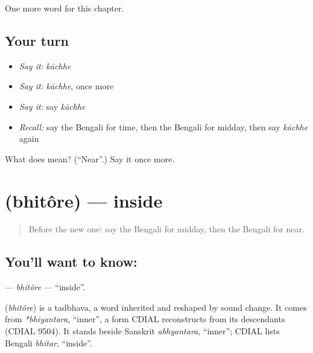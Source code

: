\begin{grammarlens}[title={What you've built}]
One more word for this chapter.
\end{grammarlens}

\subsection*{Your turn}
\begin{itemize}
\raggedright
  \item \emph{Say it:} \emph{kāchhe}
  \item \emph{Say it:} \emph{kāchhe}, once more
  \item \emph{Say it:} say \emph{kāchhe}
  \item \emph{Recall:} say the Bengali for time, then the Bengali for midday, then say \emph{kāchhe} again
\end{itemize}

\begin{tcolorbox}[breakable,colback=teal!4,colframe=teal!35!black,title={Before you move on}]
What does  mean? (\textquotedblleft{}Near\textquotedblright{}.) Say it once more.
\end{tcolorbox}
\section[\texorpdfstring{\bn{ভিতরে} (bhitôre)}{ভিতরে (bhitôre)}]{ (bhitôre) — inside}

\label{lesson:BN-C81-bhitore}



\begin{quote}
Before the new one: say the Bengali for midday, then the Bengali for near.
\end{quote}

\subsection*{You'll want to know: }
\textbf{} — \emph{bhitôre} — \textquotedblleft{}inside\textquotedblright{}.

\begin{cousinweb}
\textbf{} (\emph{bhitôre}) is a tadbhava, a word inherited and reshaped by sound change. It comes from \emph{*bhiyantara}, \textquotedblleft{}inner\textquotedblright{}, a form CDIAL reconstructs from its descendants (CDIAL 9504). It stands beside Sanskrit \emph{abhyantara}, \textquotedblleft{}inner\textquotedblright{}; CDIAL lists Bengali \emph{bhitar}, \textquotedblleft{}inside\textquotedblright{}.
\end{cousinweb}

